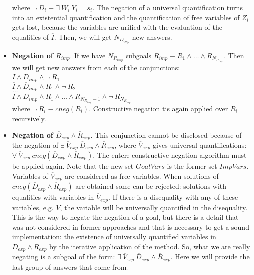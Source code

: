 \documentclass{llncs}
\begin{document}
\begin{itemize}
           where $ \neg~ D_i \equiv \exists~
           \overline{W}_i~ Y_i = s_i$. The negation of a universal
           quantification turns into an existential quantification and
           the quantification of free variables of $\overline{Z}_i$
           gets lost, because the variables are unified with the evaluation of
           the equalities of $\overline{I}$. Then, we will get
           $N_{D_{imp}}$ new answers.


           \item {\bf Negation of $\overline{R}_{imp}$}. If we have
           $N_{R_{imp}}$ subgoals $\overline{R}_{imp} \equiv R_1
           \wedge \ldots \wedge R_{N_{R_{imp}}}$. Then we will get
           new answers from each of the conjunctions: \\

           $\overline{I} \wedge \overline{D}_{imp} \wedge \neg~ R_1 $ \\ 
           $\overline{I} \wedge \overline{D}_{imp} \wedge
           R_1 \wedge \neg~ R_2 $ \\ 
           $\ldots $ \\ 
           $\overline{I} \wedge \overline{D}_{imp} \wedge
           R_1 \wedge \ldots \wedge R_{N_{R_{imp}}-1} \wedge \neg~
           R_{N_{R_{imp}}}$ \\ 

           where $ \neg~ R_i \equiv cneg(R_i)$. Constructive negation
           tis again applied over $R_i$ recursively.


           \item {\bf Negation of $\overline{D}_{exp} \wedge
           \overline{R}_{exp}$}. This conjunction cannot be disclosed
           because of the negation of $ \exists~ \overline{V}_{exp}~
           \overline{D}_{exp} \wedge \overline{R}_{exp}$, where
           $\overline{V}_{exp}$ gives universal quantifications:\\
           $\forall~ \overline{V}_{exp}~ cneg(\overline{D}_{exp}
           \wedge \overline{R}_{exp})$. The entere constructive
           negation algorithm must be applied again. Note that the new
           set $GoalVars$ is the former set $ImpVars$. Variables of
           $\overline{V}_{exp}$ are considered as free variables. When
           solutions of $cneg(\overline{D}_{exp} \wedge
           \overline{R}_{exp})$ are obtained some can be rejected:
           solutions with equalities with variables in
           $\overline{V}_{exp}$. If there is a disequality with any of
           these variables, e.g. $V$, the variable will be universally
           quantified in the disequality.  This is the way to negate
           the negation of a goal, but there is a detail that was not
           considered in former approaches and that is necessary to
           get a sound implementation: the existence of universally
           quantified variables in $\overline{D}_{exp} \wedge
           \overline{R}_{exp}$ by the iterative application of the
           method.  So, what we are really negating is a subgoal of
           the form: $ \exists~ \overline{V}_{exp}~ \overline{D}_{exp}
           \wedge \overline{R}_{exp}$.  Here we will provide the last
           group of answers that come from:


\end{itemize}
\end{document}
